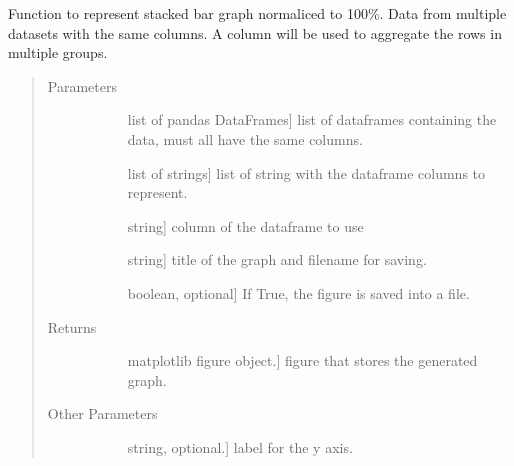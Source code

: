\documentclass[letterpaper,10pt,english]{sphinxmanual}
\begin{document}
\begin{fulllineitems}
\label{\detokenize{rstFiles/stackedBars:stackedBars.stackedbars}}
Function to represent stacked bar graph normaliced to 100\%. 
Data from multiple datasets with the same columns.
A column will be used to aggregate the rows in multiple groups.
\begin{quote}\begin{description}
\item[{Parameters}] \leavevmode\begin{description}
\item[{}] \leavevmode{[}list of pandas DataFrames{]}
list of dataframes containing the data, must all have the same columns.

\item[{}] \leavevmode{[}list of strings{]}
list of string with the dataframe columns to represent.

\item[{}] \leavevmode{[}string{]}
column of the dataframe to use

\item[{}] \leavevmode{[}string{]}
title of the graph and filename for saving.

\item[{}] \leavevmode{[}boolean, optional{]}
If True, the figure is saved into a file.

\end{description}

\item[{Returns}] \leavevmode\begin{description}
\item[{}] \leavevmode{[}matplotlib figure object.{]}
figure that stores the generated graph.

\end{description}

\item[{Other Parameters}] \leavevmode\begin{description}
\item[{}] \leavevmode{[}string, optional.{]}
label for the y axis.


\end{description}
\end{description}
\end{quote}
\end{fulllineitems}
\end{document}
